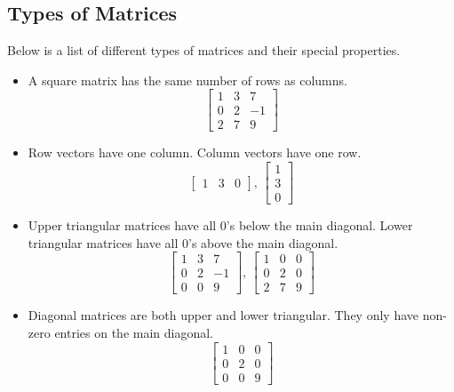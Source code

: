 \subsection{Types of Matrices}
\noindent
Below is a list of different types of matrices and their special properties.
\begin{itemize}
	\item A square matrix has the same number of rows as columns.
		\begin{equation*}
			\begin{bmatrix}
				1 & 3 & 7 \\
				0 & 2 & -1 \\
				2 & 7 & 9
			\end{bmatrix}
		\end{equation*}
	\item Row vectors have one column. Column vectors have one row.
		\begin{equation*}
			\begin{bmatrix}
			1 & 3 & 0
			\end{bmatrix} \text{, } \begin{bmatrix}
			1 \\
			3 \\
			0
			\end{bmatrix}
		\end{equation*}
	\item Upper triangular matrices have all 0's below the main diagonal. Lower triangular matrices have all 0's above the main diagonal.
		\begin{equation*}
			\begin{bmatrix}
				1 & 3 & 7 \\
				0 & 2 & -1 \\
				0 & 0 & 9
			\end{bmatrix} \text{, } \begin{bmatrix}
				1 & 0 & 0 \\
				0 & 2 & 0 \\
				2 & 7 & 9
			\end{bmatrix}
		\end{equation*}
	\item Diagonal matrices are both upper and lower triangular. They only have non-zero entries on the main diagonal.
		\begin{equation*}
			\begin{bmatrix}
				1 & 0 & 0 \\
				0 & 2 & 0 \\
				0 & 0 & 9
			\end{bmatrix}

\end{equation*}
\end{itemize}
